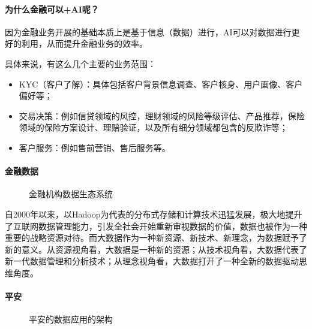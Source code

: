 \documentclass[letterpaper,11pt,english]{sphinxmanual}
\begin{document}
\paragraph{为什么金融可以+AI呢？}
\label{\detokenize{chapter_project/AI_Finance:id7}}
因为金融业务开展的基础本质上是基于信息（数据）进行，AI可以对数据进行更好的利用，从而提升金融业务的效率。

具体来说，有这么几个主要的业务范围：
\begin{itemize}
\item {} 
KYC（客户了解）：具体包括客户背景信息调查、客户核身、用户画像、客户偏好等；

\item {} 
交易决策：例如信贷领域的风控，理财领域的风险等级评估、产品推荐，保险领域的保险方案设计、理赔验证，以及所有细分领域都包含的反欺诈等；

\item {} 
客户服务：例如售前营销、售后服务等。

\end{itemize}


\paragraph{金融数据}
\label{\detokenize{chapter_project/AI_Finance:id8}}
\begin{figure}[H]
\centering
\capstart

\noindent{}
\caption{金融机构数据生态系统}\label{\detokenize{chapter_project/AI_Finance:id33}}\end{figure}

自2000年以来，以Hadoop为代表的分布式存储和计算技术迅猛发展，极大地提升了互联网数据管理能力，引发全社会开始重新审视数据的价值，数据也被作为一种重要的战略资源对待。而大数据作为一种新资源、新技术、新理念，为数据赋予了新的意义。从资源视角看，大数据是一种新的资源；从技术视角看，大数据代表了新一代数据管理和分析技术；从理念视角看，大数据打开了一种全新的数据驱动思维角度。


\paragraph{平安}
\label{\detokenize{chapter_project/AI_Finance:id9}}
\begin{figure}[H]
\centering
\capstart

\noindent{}
\caption{平安的数据应用的架构}\label{\detokenize{chapter_project/AI_Finance:id34}}\end{figure}
\end{document}
